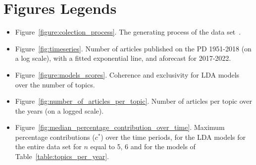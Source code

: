\documentclass{article}
\theoremstyle{definition}
\begin{document}
\section*{Figures Legends}

\begin{itemize}
  \item Figure~\ref{figure:colection_process}. The generating process of the
  data set~\citep{pd_data_2018}.
  \item Figure~\ref{fig:timeseries}. Number of articles published on the PD
  1951-2018 (on a log scale), with a fitted exponential line, and aforecast for
  2017-2022.
  \item Figure~\ref{figure:models_scores}. Coherence and exclusivity for LDA
  models over the number of topics.
  \item Figure~\ref{fig:number_of_articles_per_topic}. Number of articles per
  topic over the years (on a logged scale).
  \item Figure~\ref{fig:median_percentage_contribution_over_time}. Maximum
  percentage contributions (\(c^*\)) over the time periods,
  for the LDA models for the entire data set for \(n\) equal to 5, 6
  and for the models of Table~\ref{table:topics_per_year}.
\end{itemize}
\end{document}
